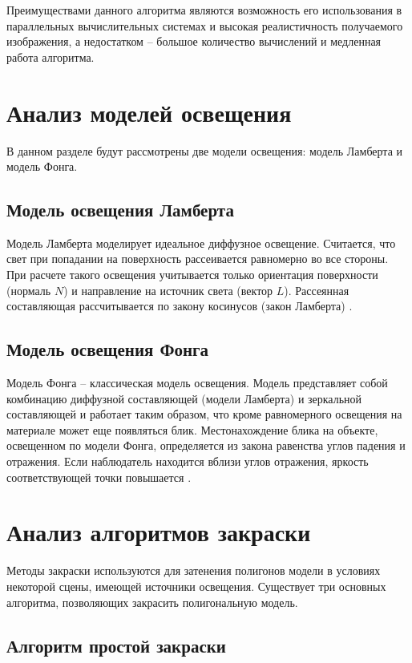 Преимуществами данного алгоритма являются возможность его использования в параллельных вычислительных системах и высокая реалистичность получаемого изображения, а недостатком -- большое количество вычислений и медленная работа алгоритма.

\section{Анализ моделей освещения}

В данном разделе будут рассмотрены две модели освещения: модель Ламберта и модель Фонга.

\subsection{Модель освещения Ламберта}

Модель Ламберта моделирует идеальное диффузное освещение. 
Считается, что свет при попадании на поверхность рассеивается равномерно во все стороны.
При расчете такого освещения учитывается только ориентация поверхности  (нормаль $N$) и направление на источник света (вектор $L$). 
Рассеянная составляющая рассчитывается по закону косинусов (закон Ламберта) \cite{info_lightModels}.

\subsection{Модель освещения Фонга}

Модель Фонга – классическая модель освещения. 
Модель представляет собой комбинацию диффузной составляющей (модели Ламберта) и зеркальной составляющей и работает таким образом, что кроме равномерного освещения на  материале может еще появляться блик. Местонахождение блика на объекте, освещенном по модели Фонга, определяется из закона равенства углов падения и отражения. 
Если наблюдатель находится вблизи углов отражения, яркость соответствующей точки повышается \cite{info_lightModels}.

\section{Анализ алгоритмов закраски}

Методы закраски используются для затенения полигонов модели в
условиях некоторой сцены, имеющей источники освещения. 
Существует три
основных алгоритма, позволяющих закрасить полигональную модель.

\subsection{Алгоритм простой закраски}

